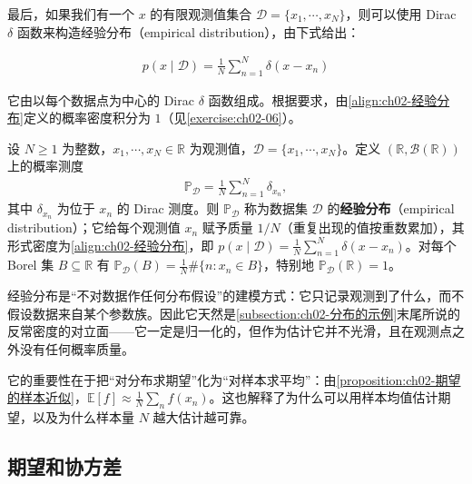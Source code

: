 \documentclass[../../main.tex]{subfiles}
\begin{document}
最后，如果我们有一个 $x$ 的有限观测值集合 $\mathcal{D}=\{x_1,\cdots,x_N\}$，则可以使用 Dirac $\delta$ 函数来构造经验分布（empirical distribution），由下式给出：

\begin{align}
  p(x\mid\mathcal{D}) = \frac{1}{N}\sum_{n=1}^{N}\delta(x-x_n)
  \label{align:ch02-经验分布}
\end{align}

它由以每个数据点为中心的 Dirac $\delta$ 函数组成。根据要求，由\eqref{align:ch02-经验分布}定义的概率密度积分为 $1$（见\cref{exercise:ch02-06}）。

\begin{definition}[经验分布]\label{definition:ch02-经验分布}
设 $N\geqslant1$ 为整数，$x_1,\cdots,x_N\in\mathbb{R}$ 为观测值，$\mathcal{D}=\{x_1,\cdots,x_N\}$。定义 $(\mathbb{R},\mathcal{B}(\mathbb{R}))$ 上的概率测度
\begin{align*}
  \mathbb{P}_{\mathcal{D}}=\frac{1}{N}\sum_{n=1}^{N}\delta_{x_n},
\end{align*}
其中 $\delta_{x_n}$ 为位于 $x_n$ 的 Dirac 测度。则 $\mathbb{P}_{\mathcal{D}}$ 称为数据集 $\mathcal{D}$ 的\textbf{经验分布}（empirical distribution）；它给每个观测值 $x_n$ 赋予质量 $1/N$（重复出现的值按重数累加），其形式密度为\eqref{align:ch02-经验分布}，即 $p(x\mid\mathcal{D})=\frac{1}{N}\sum_{n=1}^{N}\delta(x-x_n)$。对每个 Borel 集 $B\subseteq\mathbb{R}$ 有 $\mathbb{P}_{\mathcal{D}}(B)=\frac{1}{N}\#\{n:x_n\in B\}$，特别地 $\mathbb{P}_{\mathcal{D}}(\mathbb{R})=1$。
\end{definition}

\begin{remark}
经验分布是“不对数据作任何分布假设”的建模方式：它只记录观测到了什么，而不假设数据来自某个参数族。因此它天然是\cref{subsection:ch02-分布的示例}末尾所说的反常密度的对立面——它一定是归一化的，但作为估计它并不光滑，且在观测点之外没有任何概率质量。

它的重要性在于把“对分布求期望”化为“对样本求平均”：由\cref{proposition:ch02-期望的样本近似}，$\mathbb{E}[f]\approx\frac{1}{N}\sum_n f(x_n)$。这也解释了为什么可以用样本均值估计期望，以及为什么样本量 $N$ 越大估计越可靠。
\end{remark}

\subsection{期望和协方差}\label{subsection:ch02-期望和协方差}
\end{document}
